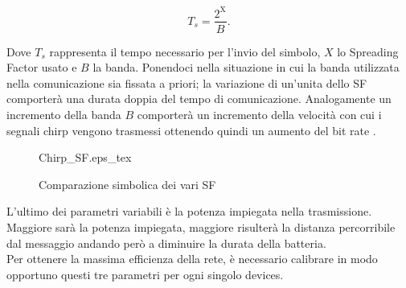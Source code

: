 \begin{equation}\label{eq:time_chirp}
        T_s=\frac{2^{\text{X}}}{B}.
\end{equation}

Dove $T_s$ rappresenta il tempo necessario per
l'invio del simbolo, $X$ lo Spreading Factor usato e $B$ la banda.
Ponendoci nella situazione in cui la banda utilizzata nella comunicazione sia fissata a
priori; la variazione di un'unita dello SF comporterà una durata doppia del
tempo di comunicazione.
Analogamente un incremento della banda $B$ comporterà un
incremento della velocità con cui i segnali chirp vengono trasmessi ottenendo
quindi un aumento del bit rate .

\begin{figure}[ht]
        \centering 
        {Chirp_SF.eps_tex}
                \caption{Comparazione simbolica dei vari SF}
        \label{fig:sf_var}
\end{figure}

L'ultimo dei parametri variabili è la potenza impiegata nella trasmissione.
Maggiore sarà la potenza impiegata, maggiore risulterà la distanza percorribile
dal messaggio andando però a diminuire la durata della batteria.\\
Per ottenere la massima efficienza della rete, è necessario calibrare in modo
opportuno questi tre parametri per ogni singolo devices. 

